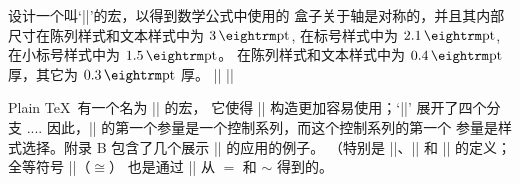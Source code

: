 \ddangerexercise 设计一个叫`|\square|'的宏，以得到数学公式中使用的%
\def\sqr#1#2{{\vcenter{\vbox{\hrule height.#2pt
      \hbox{\vrule width.#2pt height#1pt \kern#1pt \vrule}
      \hrule height.#2pt}}}}%
盒子关于轴是对称的，并且其内部尺寸在陈列样式和文本样式中为 $3\pt$,
在标号样式中为 $2.1\pt$, 在小标号样式中为 $1.5\pt$。%
在陈列样式和文本样式中为 $0.4\pt$ 厚，其它为 $0.3\pt$ 厚。
\answer |\def\sqr#1#2{{\vcenter{\vbox{\hrule height.#2pt|\parbreak
        |        \hbox{\vrule width.#2pt height#1pt \kern#1pt|\parbreak
        |           \vrule width.#2pt}|\parbreak
        |        \hrule height.#2pt}}}}|\parbreak
        |\def\square{\mathchoice\sqr34\sqr34\sqr{2.1}3\sqr{1.5}3}|

\ddanger Plain \TeX\ 有一个名为 |\mathpalette| 的宏，
它使得 |\mathchoice| 构造更加容易使用；`|\mathpalette{}|' 展开了四个分支
\begintt
{}...{\a{}}.
\endtt
因此，|\mathpalette| 的第一个参量是一个控制系列，而这个控制系列的第一个
参量是样式选择。附录 B 包含了几个展示 |\mathpalette| 的应用的例子。%
（特别是 |\phantom|、|\root| 和 |\smash| 的定义；全等符号 |\cong|（$\cong$）%
也是通过 |\mathpalette| 从 $=$ 和 $\sim$ 得到的。

